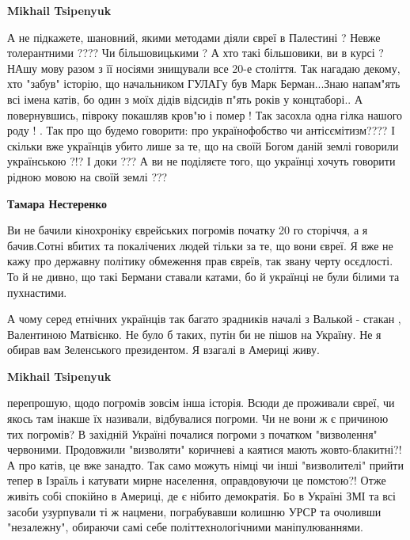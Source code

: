 \begin{itemize}
\begin{itemize}
\begin{itemize}
 
\textbf{Mikhail Tsipenyuk} 

А не підкажете, шановний, якими методами діяли євреї в Палестині ? Невже
толерантними ???? Чи більшовицькими ? А хто такі більшовики, ви в курсі ? НАшу
мову разом з її носіями знищували все 20-е століття. Так нагадаю декому, хто
"забув" історію, що начальником ГУЛАГу був Марк Берман...Знаю напам"ять всі
імена катів, бо один з моїх дідів відсидів п"ять років у концтаборі.. А
повернувшись, півроку покашляв кров"ю і помер ! Так засохла одна гілка нашого
роду ! . Так про що будемо говорити: про українофобство чи антісємітизм???? І
скільки вже українців убито лише за те, що на своїй Богом даній землі говорили
українською ?!? І доки ??? А ви не поділяєте того, що українці хочуть говорити
рідною мовою на своїй землі ???

 
\textbf{Тамара Нестеренко} 

Ви не бачили кінохроніку єврейських погромів початку 20 го сторіччя, а я
бачив.Сотні вбитих та покалічених людей тільки за те, що вони євреї. Я вже не
кажу про державну політику обмеження прав євреїв, так звану черту осєдлості. То
й не дивно, що такі Бермани ставали катами, бо й українці не були білими та
пухнастими.

А чому серед етнічних українців так багато зрадників началі з Валькой - стакан
, Валентиною Матвієнко. Не було б таких, путін би не пішов на Україну. Не я
обирав вам Зеленського президентом. Я взагалі в Америці живу.

 
\textbf{Mikhail Tsipenyuk} 

перепрошую, щодо погромів зовсім інша історія. Всюди де проживали євреї, чи
якось там інакше їх називали, відбувалися погроми. Чи не вони ж є причиною тих
погромів? В західній Україні почалися погроми з початком "визволення"
червоними. Продовжили "визволяти" коричневі а каятися мають жовто-блакитні?! А
про катів, це вже занадто. Так само можуть німці чи інші "визволителі" прийти
тепер в Ізраїль і катувати мирне населення, оправдовуючи це помстою?! Отже
живіть собі спокійно в Америці, де є нібито демократія. Бо в Україні ЗМІ та всі
засоби узурпували ті ж нацмени, пограбувавши колишню УРСР та очоливши
"незалежну", обираючи самі себе політтехнологічними маніпулюваннями.


\end{itemize}
\end{itemize}
\end{itemize}
